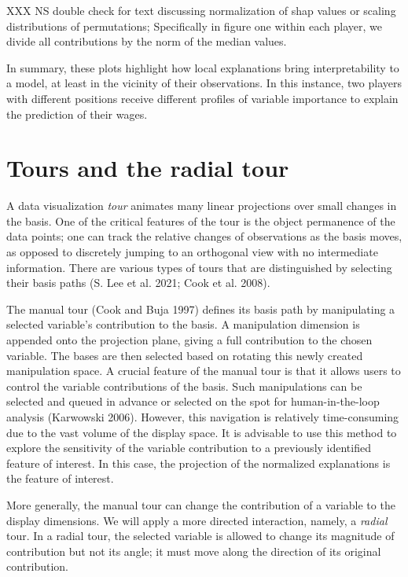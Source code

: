 \documentclass[
]{article}
\begin{document}
XXX NS double check for text discussing normalization of shap values or
scaling distributions of permutations; Specifically in figure one within
each player, we divide all contributions by the norm of the median
values.

In summary, these plots highlight how local explanations bring
interpretability to a model, at least in the vicinity of their
observations. In this instance, two players with different positions
receive different profiles of variable importance to explain the
prediction of their wages.

\hypertarget{tours-and-the-radial-tour}{%
\section{Tours and the radial tour}\label{tours-and-the-radial-tour}}

A data visualization \emph{tour} animates many linear projections over
small changes in the basis. One of the critical features of the tour is
the object permanence of the data points; one can track the relative
changes of observations as the basis moves, as opposed to discretely
jumping to an orthogonal view with no intermediate information. There
are various types of tours that are distinguished by selecting their
basis paths (S. Lee et al. 2021; Cook et al. 2008).

The manual tour (Cook and Buja 1997) defines its basis path by
manipulating a selected variable's contribution to the basis. A
manipulation dimension is appended onto the projection plane, giving a
full contribution to the chosen variable. The bases are then selected
based on rotating this newly created manipulation space. A crucial
feature of the manual tour is that it allows users to control the
variable contributions of the basis. Such manipulations can be selected
and queued in advance or selected on the spot for human-in-the-loop
analysis (Karwowski 2006). However, this navigation is relatively
time-consuming due to the vast volume of the display space. It is
advisable to use this method to explore the sensitivity of the variable
contribution to a previously identified feature of interest. In this
case, the projection of the normalized explanations is the feature of
interest.

More generally, the manual tour can change the contribution of a
variable to the display dimensions. We will apply a more directed
interaction, namely, a \emph{radial} tour. In a radial tour, the
selected variable is allowed to change its magnitude of contribution but
not its angle; it must move along the direction of its original
contribution.
\end{document}
